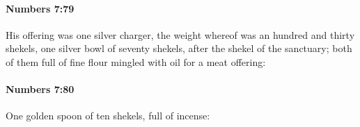 		\paragraph{Numbers 7:79} %
			\label{NUMBERS-7-79}

			His offering was one silver charger, the weight whereof was an hundred and thirty shekels, one silver bowl of seventy shekels, after the shekel of the sanctuary; both of them full of fine flour mingled with oil for a meat offering:


		\paragraph{Numbers 7:80} %
			\label{NUMBERS-7-80}

			One golden spoon of ten shekels, full of incense:


